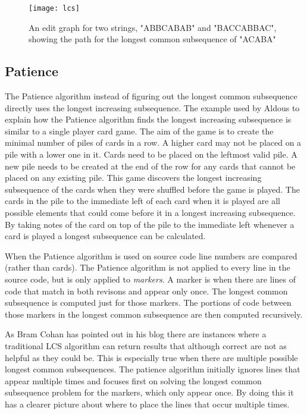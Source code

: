 \begin{figure}[!t]
 \begin{center}
 \texttt{[image: lcs]}
 \end{center}
 \caption{An edit graph for two strings, "ABBCABAB" and "BACCABBAC", showing the path for the longest common subsequence of "ACABA"}
 \label{fig:lcs}
\end{figure}



\subsection{Patience}
The Patience algorithm instead of figuring out the longest common subsequence directly uses the longest increasing subsequence. 
The example used by Aldous \cite{Aldous1999} to explain how the Patience algorithm finds the longest increasing subsequence is similar to a single player card game.
The aim of the game is to create the minimal number of piles of cards in a row.
A higher card may not be placed on a pile with a lower one in it.
Cards need to be placed on the leftmost valid pile. 
A new pile needs to be created at the end of the row for any cards that cannot be placed on any existing pile.
This game discovers the longest increasing subsequence of the cards when they were shuffled before the game is played.
The cards in the pile to the immediate left of each card when it is played are all possible elements that could come before it in a longest increasing subsequence.
By taking notes of the card on top of the pile to the immediate left whenever a card is played a longest subsequence can be calculated.     

When the Patience algorithm is used on source code line numbers are compared (rather than cards).
The Patience algorithm is not applied to every line in the source code, but is only applied to \emph{markers}.
A marker is when there are lines of code that match in both revisons and appear only once.
The longest common subsequence is computed just for those markers.
The portions of code between those markers in the longest common subsequence are then computed recursively.   

As Bram Cohan \cite{bramcohen} has pointed out in his blog there are instances where a traditional LCS algorithm can return results that although correct are not as helpful as they could be.
This is especially true when there are multiple possible longest common subsequences.
The patience algorithm initially ignores lines that appear multiple times and focuses first on solving the longest common subsequence problem for the markers, which only appear once. 
By doing this it has a clearer picture about where to place the lines that occur multiple times.

